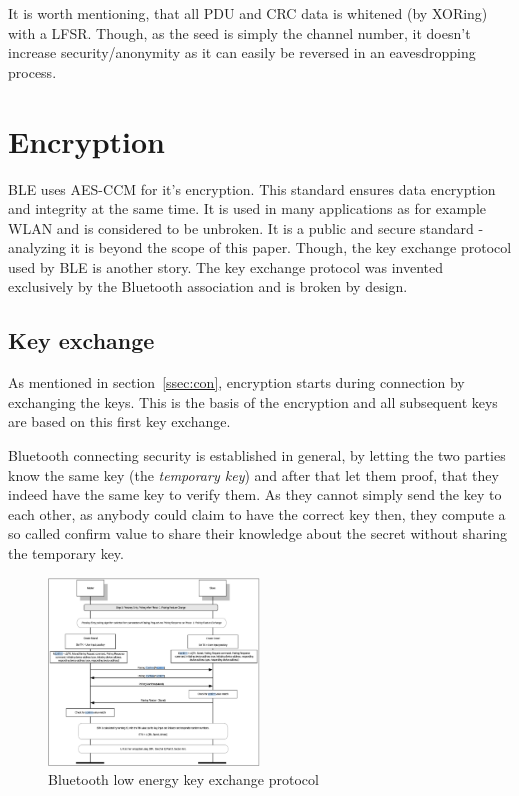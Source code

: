\documentclass[conference]{IEEEtran}
\begin{document}
It is worth mentioning, that all PDU and CRC data is whitened (by XORing) with 
a LFSR. Though, as the seed is simply the channel number, it doesn't increase 
security/anonymity as it can easily be reversed in an eavesdropping process.


\section{Encryption}

BLE uses AES-CCM for it's encryption. This standard ensures data encryption and 
integrity at the same time. It is used in many applications as for example WLAN 
and is considered to be unbroken. It is a public and secure standard - 
analyzing it is beyond the scope of this paper. Though, the key exchange 
protocol used by BLE is another story. The key 
exchange protocol was invented exclusively by the Bluetooth association and is 
broken by design.


\subsection{Key exchange}
\label{sub:key_exchange}

As mentioned in section~\ref{ssec:con}, encryption starts during connection by exchanging the keys. This is the basis of the encryption and all subsequent keys are based on this first key exchange.

Bluetooth connecting security is established in general, by letting the two 
parties know the same key (the \emph{temporary key}) and after that let them 
proof, that they indeed have the same key to verify them. As they cannot simply 
send the key to each other, as anybody could claim to have the correct key 
then, they compute a so called confirm value to share their knowledge about the 
secret without sharing the temporary key.

\begin{figure}
  \centering
    \includegraphics[width=0.5\textwidth]{keyexchange}
    \caption{Bluetooth low energy key exchange protocol \cite{ble40}}
  \label{fig:keyexchange}
\end{figure}
\end{document}
